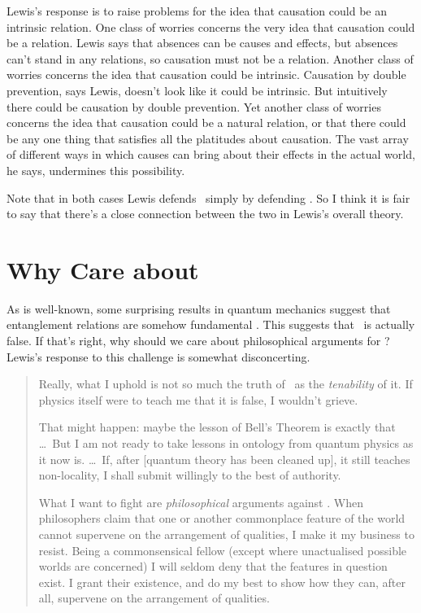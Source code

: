 Lewis's response is to raise problems for the idea that causation could be an intrinsic relation.  One class of worries concerns the very idea that causation could be a relation. Lewis says that  absences can be causes and effects, but absences can't stand in any relations,  so causation must not be a relation. Another class of worries concerns the idea that causation could be intrinsic. Causation by double prevention, says Lewis, doesn't look  like it could be intrinsic. But intuitively there could be causation by double prevention. Yet another class of worries concerns the idea that causation could be a natural relation, or that there could be  any one thing that satisfies all the platitudes about causation. The vast array of different ways in which causes can bring about their effects in the actual world, he says, undermines this possibility.

Note that in both cases Lewis defends \HS\  simply by defending \NR. So I think it is fair to say that there's a close connection between the two in Lewis's overall theory.

\section{Why Care about \HS}

As is well-known, some surprising results in quantum mechanics  suggest that entanglement relations are somehow fundamental \citep{Maudlin1994}.  This suggests that \HS\  is actually false. If that's right, why should we care about philosophical arguments for \HS? Lewis's response to this challenge is somewhat disconcerting.

\begin{quote}
Really, what I uphold is not so much the truth of \HS\ as the \textit{tenability} of it. If physics itself were to teach me that it is false, I wouldn't grieve.

 That might happen: maybe the lesson of Bell's Theorem is exactly that \dots\  But I am not ready to take lessons in ontology from quantum physics as it now is. \dots\ If, after [quantum theory has been cleaned up],  it still teaches non-locality, I shall submit willingly to the best of authority.

What I want to fight are \textit{philosophical} arguments against \HS.  When philosophers claim that one or another commonplace feature of the world cannot supervene on the arrangement of qualities, I make it my business to resist. Being a commonsensical fellow  (except where unactualised possible worlds are concerned)  I will seldom deny that the features in question exist. I grant their existence, and do my best to show how they can, after all, supervene on the arrangement of qualities. \citep[xi]{Lewis1986b}
\end{quote}

